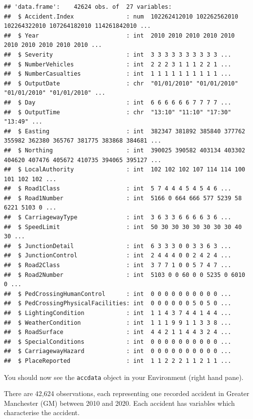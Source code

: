 \documentclass[
]{article}
\begin{document}
\begin{verbatim}
## 'data.frame':    42624 obs. of  27 variables:
##  $ Accident.Index               : num  102262412010 102262562010 102264322010 107264182010 114261842010 ...
##  $ Year                         : int  2010 2010 2010 2010 2010 2010 2010 2010 2010 2010 ...
##  $ Severity                     : int  3 3 3 3 3 3 3 3 3 3 ...
##  $ NumberVehicles               : int  2 2 2 3 1 1 1 2 2 1 ...
##  $ NumberCasualties             : int  1 1 1 1 1 1 1 1 1 1 ...
##  $ OutputDate                   : chr  "01/01/2010" "01/01/2010" "01/01/2010" "01/01/2010" ...
##  $ Day                          : int  6 6 6 6 6 6 7 7 7 7 ...
##  $ OutputTime                   : chr  "13:10" "11:10" "17:30" "13:49" ...
##  $ Easting                      : int  382347 381892 385840 377762 355982 362380 365767 381775 383868 384681 ...
##  $ Northing                     : int  390025 390582 403134 403302 404620 407476 405672 410735 394065 395127 ...
##  $ LocalAuthority               : int  102 102 102 107 114 114 100 101 102 102 ...
##  $ Road1Class                   : int  5 7 4 4 4 5 4 5 4 6 ...
##  $ Road1Number                  : int  5166 0 664 666 577 5239 58 6221 5103 0 ...
##  $ CarriagewayType              : int  3 6 3 3 6 6 6 6 3 6 ...
##  $ SpeedLimit                   : int  50 30 30 30 30 30 30 30 40 30 ...
##  $ JunctionDetail               : int  6 3 3 3 0 0 3 3 6 3 ...
##  $ JunctionControl              : int  2 4 4 4 0 0 2 4 2 4 ...
##  $ Road2Class                   : int  3 7 7 1 0 0 5 7 4 7 ...
##  $ Road2Number                  : int  5103 0 0 60 0 0 5235 0 6010 0 ...
##  $ PedCrossingHumanControl      : int  0 0 0 0 0 0 0 0 0 0 ...
##  $ PedCrossingPhysicalFacilities: int  0 0 0 0 0 0 5 0 5 0 ...
##  $ LightingCondition            : int  1 1 4 3 7 4 4 1 4 4 ...
##  $ WeatherCondition             : int  1 1 1 9 9 1 1 3 3 8 ...
##  $ RoadSurface                  : int  4 4 2 1 1 4 4 3 2 4 ...
##  $ SpecialConditions            : int  0 0 0 0 0 0 0 0 0 0 ...
##  $ CarriagewayHazard            : int  0 0 0 0 0 0 0 0 0 0 ...
##  $ PlaceReported                : int  1 1 2 2 2 1 1 2 1 1 ...
\end{verbatim}

You should now see the \texttt{accdata} object in your Environment
(right hand pane).

There are 42,624 observations, each representing one recorded accident
in Greater Manchester (GM) between 2010 and 2020. Each accident has
variables which characterise the accident.
\end{document}
